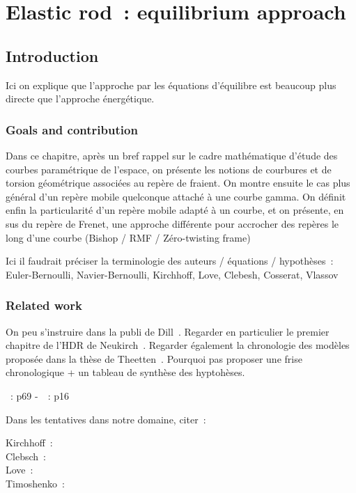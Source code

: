 \chapter{Elastic rod~: equilibrium approach}
\label{sec:ch_kirchhoff}

\section{Introduction}
Ici on explique que l'approche par les équations d'équilibre est beaucoup plus directe que l'approche énergétique.

\subsection{Goals and contribution}
Dans ce chapitre, après un bref rappel sur le cadre mathématique d'étude des courbes paramétrique de l'espace, on présente les notions de courbures et de torsion géométrique associées au repère de fraient. On montre ensuite le cas plus général d'un repère mobile quelconque attaché à une courbe gamma. On définit enfin la particularité d'un repère mobile adapté à un courbe, et on présente, en sus du repère de Frenet, une approche différente pour accrocher des repères le long d'une courbe (Bishop / RMF / Zéro-twisting frame)

Ici il faudrait préciser la terminologie des auteurs / équations / hypothèses~:
Euler-Bernoulli, Navier-Bernoulli, Kirchhoff, Love, Clebesh, Cosserat, Vlassov

\subsection{Related work}
On peu s'instruire dans la publi de Dill~\cite{Dill1992}.
Regarder en particulier le premier chapitre de l'HDR de Neukirch~\cite{Neukirch2009}.
Regarder également la chronologie des modèles proposée dans la thèse de Theetten~\cite{Theetten2007}.
Pourquoi pas proposer une frise chronologique + un tableau de synthèse des hyptohèses.

\cite{Dill1992}
\citet{Neukirch2009}
\cite{Adriaenssens1999}
\cite{Hoogenboom2006}
\cite{Lang2009}
\cite{Spillmann2008}
\cite{Antman2005}

\cite{Neukirch2009}~: p69 -~\cite{Dill1992}~: p16

Dans les tentatives dans notre domaine, citer~:

Kirchhoff~:~\cite{Kirchhoff1850, Kirchhoff1876} \\
Clebsch~:~\cite{Clebsch1883} \\
Love~:~\cite{Love1892} \\
Timoshenko~:~\cite{Timoshenko1921, Timoshenko1922, Timoshenko1951}

